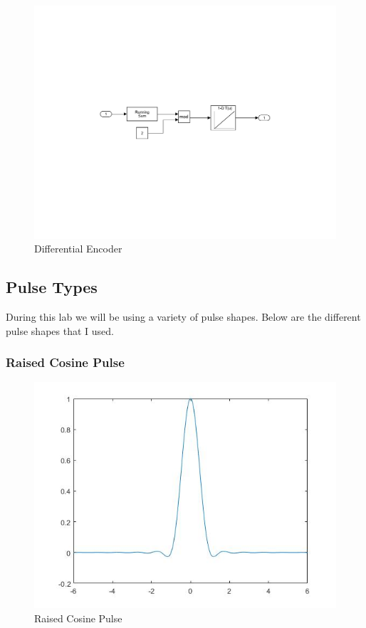 \documentclass{article}
\begin{document}
\begin{figure}[H]
  \includegraphics[width = \linewidth]{Differential_Encoder.jpg}
  \caption{Differential Encoder}
  \label{fig:Duobinary-System}
\end{figure}
\subsection{Pulse Types}
During this lab we will be using a variety of pulse shapes. Below are the different pulse shapes that I used.
\subsubsection{Raised Cosine Pulse}
\begin{figure}[H]
  \begin{center}
    \includegraphics[width = 0.4\linewidth]{Raised_Cosine_Pulse.jpg}
    \caption{Raised Cosine Pulse}
    \label{fig:Raised_Cosine_Pulse}
  \end{center}
\end{figure}
\end{document}
